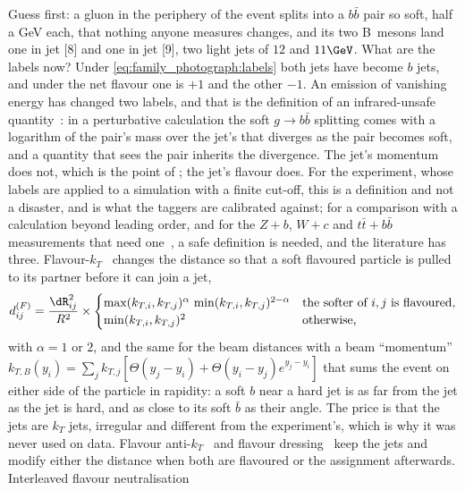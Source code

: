 Guess first: a gluon in the periphery of the event splits into a $b\bar b$
pair so soft, half a GeV each, that nothing anyone measures changes, and
its two B~mesons land one in jet [8] and one in jet [9], two light jets of
$12$ and $11\GeV$. What are the labels now? Under
\cref{eq:family_photograph:labels} both jets have become $b$ jets, and
under the net flavour one is $+1$ and the other $-1$. An emission of
vanishing energy has changed two labels, and that is the definition of
an infrared-unsafe quantity~\cite{Sterman:1977wj,Salam:2009jx}: in a
perturbative calculation the soft $g\to b\bar b$ splitting comes with a
logarithm of the pair's mass over the jet's \pt that diverges as the pair
becomes soft, and a quantity that sees the pair inherits the divergence.
The jet's momentum does not, which is the point of \antikt; the jet's
flavour does. For the experiment, whose labels are applied to a
simulation with a finite cut-off, this is a definition and not a
disaster, and \hadflav is what the taggers are calibrated against; for a
comparison with a calculation beyond leading order, and for the $Z+b$,
$W+c$ and $t\bar t+b\bar b$ measurements that need
one~\cite{Banfi:2007gu,Gauld:2020deh}, a safe definition is needed, and
the literature has three. Flavour-$k_T$~\cite{Banfi:2006hf} changes the
distance so that a soft flavoured particle is pulled to its partner
before it can join a jet,
\begin{equation}
  \dij^{(F)}=\frac{\dR_{ij}^2}{R^2}\times\begin{cases}
    \max(k_{T,i},k_{T,j})^{\alpha}\,\min(k_{T,i},k_{T,j})^{2-\alpha} & \text{the softer of $i,j$ is flavoured,}\\
    \min(k_{T,i},k_{T,j})^2 & \text{otherwise,}\end{cases}
  \label{eq:family_photograph:fkt}
\end{equation}
with $\alpha=1$ or $2$, and the same for the beam distances with a beam
``momentum'' $k_{T,B}(y_i)=\sum_j k_{T,j}[\Theta(y_j-y_i)+\Theta(y_i-y_j)e^{y_j-y_i}]$
that sums the event on either side of the particle in rapidity: a soft
$b$ near a hard jet is as far from the jet as the jet is hard, and as
close to its soft $\bar b$ as their angle. The price is that the jets are
$k_T$ jets, irregular and different from the experiment's, which is why
it was never used on data. Flavour anti-$k_T$~\cite{Czakon:2022khx} and
flavour dressing~\cite{Gauld:2022lem} keep the \antikt jets and modify
either the distance when both are flavoured or the assignment
afterwards. Interleaved flavour neutralisation~\cite{Caletti:2022glq}
